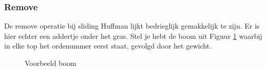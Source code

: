 \documentclass[twoside,twocolumn]{article}
\begin{document}
        \subsubsection{Remove}
        De remove operatie bij sliding Huffman lijkt bedrieglijk gemakkelijk te zijn.
        Er is hier echter een addertje onder het gras.
        Stel je hebt de boom uit Figuur \ref{boom4} waarbij in elke top het ordenummer eerst staat, gevolgd door het gewicht. 
        \begin{figure}[H]
            \begin{center}
            \end{center}
            \caption{Voorbeeld boom}
            \label{boom4}
        \end{figure}
        
\end{document}
